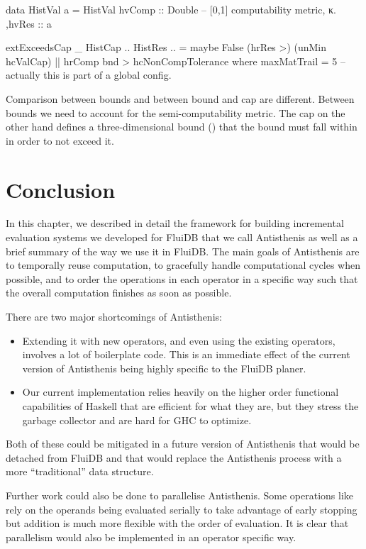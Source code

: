 \begin{code}
\begin{haskellcode}
data HistVal a =
  HistVal
  { hvComp :: Double  -- [0,1] computability metric, κ.
   ,hvRes :: a
  }

extExceedsCap _ HistCap {..} HistRes {..} =
  maybe False (hrRes >) (unMin hcValCap)
  || hrComp bnd > hcNonCompTolerance
  where
    maxMatTrail = 5 -- actually this is part of a global config.
\end{haskellcode}
  \caption{\label{lst:def_histval}Comparison between bounds and
    between bound and cap are different. Between bounds we need to
    account for the semi-computability metric. The cap on the other
    hand defines a three-dimensional bound () that the bound must fall
    within in order to not exceed it.}
\end{code}

\section{Conclusion}

In this chapter, we described in detail the framework for building
incremental evaluation systems we developed for FluiDB that we call
Antisthenis as well as a brief summary of the way we use it in
FluiDB. The main goals of Antisthenis are to temporally reuse computation, to
gracefully handle computational cycles when possible, and to order the operations in
each operator in a specific way such that the overall computation
finishes as soon as possible.

There are two major shortcomings of Antisthenis:

\begin{itemize}
\item Extending it with new operators, and even using the existing operators,
involves a lot of boilerplate code. This is an immediate effect of the
current version of Antisthenis being highly specific to the FluiDB
planer.
\item Our current implementation relies heavily on the higher order
functional capabilities of Haskell that are efficient for what they
are, but they stress the garbage collector and are hard for GHC to
optimize.
\end{itemize}

Both of these could be mitigated in a future version of Antisthenis
that would be detached from FluiDB and that would replace the
Antisthenis process with a more ``traditional'' data structure.

Further work could also be done to parallelise Antisthenis. Some
operations like  rely on the operands being evaluated
serially to take advantage of early stopping but addition is much more
flexible with the order of evaluation. It is clear that parallelism
would also be implemented in an operator specific way.


